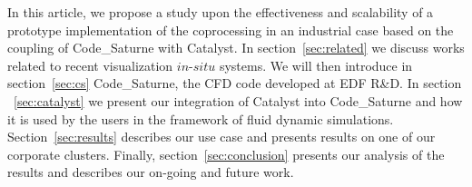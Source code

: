 In this article, we propose a study upon the effectiveness and scalability of a
prototype implementation of the coprocessing in an industrial case based on the
coupling of Code\_Saturne with Catalyst. In section~\ref{sec:related} we
discuss works related to recent visualization $in$-$situ$ systems. We will then
introduce in section~\ref{sec:cs} Code\_Saturne, the CFD code developed at EDF
R\&D. In section ~\ref{sec:catalyst} we present our integration of Catalyst into
Code\_Saturne and how it is used by the users in the framework of fluid dynamic
simulations. Section~\ref{sec:results} describes our use case and presents
results on one of our corporate clusters. Finally, section~\ref{sec:conclusion} 
presents our analysis of the results and describes our on-going and future work.

